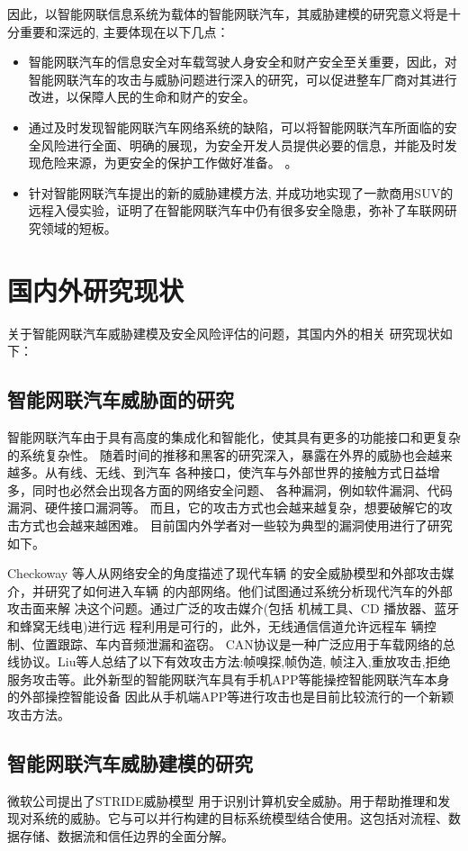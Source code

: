 因此，以智能网联信息系统为载体的智能网联汽车，其威胁建模的研究意义将是十分重要和深远的, 主要体现在以下几点：
\begin{itemize}
  \item 智能网联汽车的信息安全对车载驾驶人身安全和财产安全至关重要，因此，对智能网联汽车的攻击与威胁问题进行深入的研究，可以促进整车厂商对其进行改进，以保障人民的生命和财产的安全。
  \item 通过及时发现智能网联汽车网络系统的缺陷，可以将智能网联汽车所面临的安全风险进行全面、明确的展现，为安全开发人员提供必要的信息，并能及时发现危险来源，为更安全的保护工作做好准备。  。
  \item 针对智能网联汽车提出的新的威胁建模方法, 并成功地实现了一款商用SUV的远程入侵实验，证明了在智能网联汽车中仍有很多安全隐患，弥补了车联网研究领域的短板。  
\end{itemize}
\section{国内外研究现状}
关于智能网联汽车威胁建模及安全风险评估的问题，其国内外的相关
研究现状如下：

\subsection{智能网联汽车威胁面的研究}
智能网联汽车由于具有高度的集成化和智能化，使其具有更多的功能接口和更复杂的系统复杂性。
随着时间的推移和黑客的研究深入，暴露在外界的威胁也会越来越多。从有线、无线、到汽车
各种接口，使汽车与外部世界的接触方式日益增多，同时也必然会出现各方面的网络安全问题、
各种漏洞，例如软件漏洞、代码漏洞、硬件接口漏洞等。
而且，它的攻击方式也会越来越复杂，想要破解它的攻击方式也会越来越困难。
目前国内外学者对一些较为典型的漏洞使用进行了研究如下。

Checkoway\cite{checkoway2011comprehensive} 等人从网络安全的角度描述了现代车辆
的安全威胁模型和外部攻击媒介，并研究了如何进入车辆
的内部网络。他们试图通过系统分析现代汽车的外部攻击面来解
决这个问题。通过广泛的攻击媒介(包括
机械工具、CD 播放器、蓝牙和蜂窝无线电)进行远
程利用是可行的，此外，无线通信信道允许远程车
辆控制、位置跟踪、车内音频泄漏和盗窃。
CAN协议是一种广泛应用于车载网络的总线协议。Liu\cite{liu2017vehicle}等人总结了以下有效攻击方法:帧嗅探,帧伪造,
帧注入,重放攻击,拒绝服务攻击等。此外新型的智能网联汽车具有手机APP等能操控智能网联汽车本身的外部操控智能设备
因此从手机端APP等进行攻击也是目前比较流行的一个新颖攻击方法。

\subsection{智能网联汽车威胁建模的研究}
微软公司提出了STRIDE威胁模型 \cite{kohnfelder1999threats} 用于识别计算机安全威胁。用于帮助推理和发现对系统的威胁。它与可以并行构建的目标系统模型结合使用。这包括对流程、数据存储、数据流和信任边界的全面分解。

